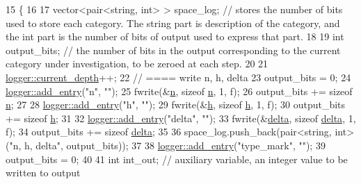 \begin{DoxyCode}
15                                                  \{
16 
17   vector<pair<string, int> > space\_log; \textcolor{comment}{// stores the number of bits used to store each category. The
       string part is description of the category, and the int part is the number of bits of output used to express that
       part.}
18 
19   \textcolor{keywordtype}{int} output\_bits; \textcolor{comment}{// the number of bits in the output corresponding to the current category under
       investigation, to be zeroed at each step.}
20 
21   \hyperlink{classlogger_a9d29b49bd318a719a8e85b59eac54fe0}{logger::current\_depth}++;
22   \textcolor{comment}{// ==== write n, h, delta}
23   output\_bits = 0;
24   \hyperlink{classlogger_a710163deb17bc81f70d53d285b8ac9ac}{logger::add\_entry}(\textcolor{stringliteral}{"n"}, \textcolor{stringliteral}{""});
25   fwrite(&\hyperlink{classmarked__graph__compressed_a8d841016ddb11cfd33748c8deb6277ba}{n}, \textcolor{keyword}{sizeof} \hyperlink{classmarked__graph__compressed_a8d841016ddb11cfd33748c8deb6277ba}{n}, 1, f);
26   output\_bits += \textcolor{keyword}{sizeof} \hyperlink{classmarked__graph__compressed_a8d841016ddb11cfd33748c8deb6277ba}{n};
27 
28   \hyperlink{classlogger_a710163deb17bc81f70d53d285b8ac9ac}{logger::add\_entry}(\textcolor{stringliteral}{"h"}, \textcolor{stringliteral}{""});
29   fwrite(&\hyperlink{classmarked__graph__compressed_af6ff623407b673d08d0cab77b39c2193}{h}, \textcolor{keyword}{sizeof} \hyperlink{classmarked__graph__compressed_af6ff623407b673d08d0cab77b39c2193}{h}, 1, f);
30   output\_bits += \textcolor{keyword}{sizeof} \hyperlink{classmarked__graph__compressed_af6ff623407b673d08d0cab77b39c2193}{h};
31 
32   \hyperlink{classlogger_a710163deb17bc81f70d53d285b8ac9ac}{logger::add\_entry}(\textcolor{stringliteral}{"delta"}, \textcolor{stringliteral}{""});
33   fwrite(&\hyperlink{classmarked__graph__compressed_a8b2aaac68e9332ddc78d88eb60b323a7}{delta}, \textcolor{keyword}{sizeof} \hyperlink{classmarked__graph__compressed_a8b2aaac68e9332ddc78d88eb60b323a7}{delta}, 1, f);
34   output\_bits += \textcolor{keyword}{sizeof} \hyperlink{classmarked__graph__compressed_a8b2aaac68e9332ddc78d88eb60b323a7}{delta};
35 
36   space\_log.push\_back(pair<string, int> (\textcolor{stringliteral}{"n, h, delta"}, output\_bits));
37 
38   \hyperlink{classlogger_a710163deb17bc81f70d53d285b8ac9ac}{logger::add\_entry}(\textcolor{stringliteral}{"type\_mark"}, \textcolor{stringliteral}{""});
39   output\_bits = 0;
40 
41   \textcolor{keywordtype}{int} int\_out; \textcolor{comment}{// auxiliary variable, an integer value to be written to output}

\end{DoxyCode}
